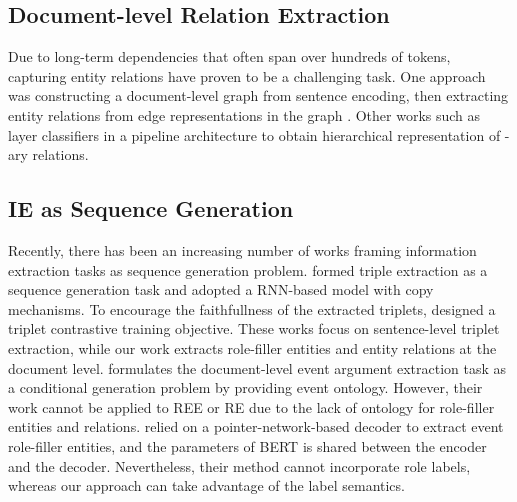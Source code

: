 \documentclass[11pt]{article}
\begin{document}
\subsection{Document-level Relation Extraction}
Due to long-term dependencies that often span over hundreds of tokens, capturing entity relations have proven to be a challenging task. One approach was constructing a document-level graph from sentence encoding, then extracting entity relations from edge representations in the graph \cite{christopoulou-etal-2019-connecting}. Other works such as \citet{jia-etal-2019-document} layer classifiers in a pipeline architecture to obtain hierarchical representation of -ary relations.

\subsection{IE as Sequence Generation}
Recently, there has been an increasing number of works framing information extraction tasks as sequence generation problem. \citet{zeng-etal-2018-extracting} formed triple extraction as a sequence generation task and adopted a RNN-based model with copy mechanisms. To encourage the faithfullness of the extracted triplets, \citet{ye2020contrastive} designed a triplet contrastive training objective. These works focus on sentence-level triplet extraction, while our work extracts role-filler entities and entity relations at the document level. \citet{li2021documentlevel,hsu2021event} formulates the document-level event argument extraction task as a conditional generation problem by providing event ontology. However, their work cannot be applied to REE or RE due to the lack of ontology for role-filler entities and relations. \citet{du-2020-grit} relied on a pointer-network-based decoder \cite{10.5555/2969442.2969540} to extract event role-filler entities, and the parameters of \textsc{BERT} \cite{Devlin_2019} is shared between the encoder and the decoder. Nevertheless, their method cannot incorporate role labels, whereas our approach can take advantage of the label semantics.
\end{document}
